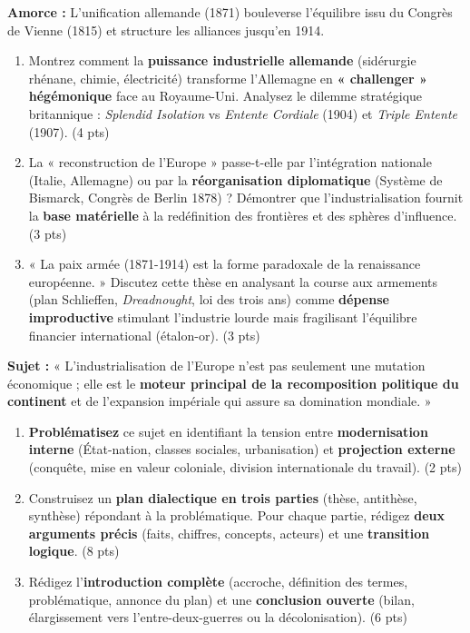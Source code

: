 \documentclass[11pt]{article}
\begin{document}
\begin{exercice}
\textbf{Amorce :} L'unification allemande (1871) bouleverse l'équilibre issu du Congrès de Vienne (1815) et structure les alliances jusqu'en 1914.

\begin{enumerate}
    \item Montrez comment la \textbf{puissance industrielle allemande} (sidérurgie rhénane, chimie, électricité) transforme l'Allemagne en \textbf{« challenger » hégémonique} face au Royaume-Uni. Analysez le dilemme stratégique britannique : \textit{Splendid Isolation} vs \textit{Entente Cordiale} (1904) et \textit{Triple Entente} (1907). \hfill (4 pts)
    \item La « reconstruction de l'Europe » passe-t-elle par l'intégration nationale (Italie, Allemagne) ou par la \textbf{réorganisation diplomatique} (Système de Bismarck, Congrès de Berlin 1878) ? Démontrer que l'industrialisation fournit la \textbf{base matérielle} à la redéfinition des frontières et des sphères d'influence. \hfill (3 pts)
    \item « La paix armée (1871-1914) est la forme paradoxale de la renaissance européenne. » Discutez cette thèse en analysant la course aux armements (plan Schlieffen, \textit{Dreadnought}, loi des trois ans) comme \textbf{dépense improductive} stimulant l'industrie lourde mais fragilisant l'équilibre financier international (étalon-or). \hfill (3 pts)
\end{enumerate}
\end{exercice}

\begin{exercice}
\textbf{Sujet :} « L'industrialisation de l'Europe n'est pas seulement une mutation économique ; elle est le \textbf{moteur principal de la recomposition politique du continent} et de l'expansion impériale qui assure sa domination mondiale. »

\begin{enumerate}
    \item \textbf{Problématisez} ce sujet en identifiant la tension entre \textbf{modernisation interne} (État-nation, classes sociales, urbanisation) et \textbf{projection externe} (conquête, mise en valeur coloniale, division internationale du travail). \hfill (2 pts)
    \item Construisez un \textbf{plan dialectique en trois parties} (thèse, antithèse, synthèse) répondant à la problématique. Pour chaque partie, rédigez \textbf{deux arguments précis} (faits, chiffres, concepts, acteurs) et une \textbf{transition logique}. \hfill (8 pts)
    \item Rédigez l'\textbf{introduction complète} (accroche, définition des termes, problématique, annonce du plan) et une \textbf{conclusion ouverte} (bilan, élargissement vers l'entre-deux-guerres ou la décolonisation). \hfill (6 pts)
\end{enumerate}
\end{exercice}
\end{document}
